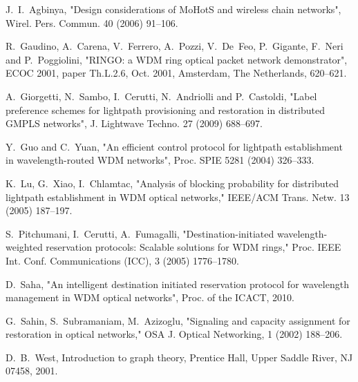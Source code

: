 \documentclass[journal,draftcls,onecolumn,12pt,twoside]{IEEEtran}
\begin{document}
\begin{thebibliography}{1}

J.~I.~Agbinya, "Design considerations of MoHotS and wireless chain networks", Wirel. Pers. Commun. 40 (2006) 91--106.

R.~Gaudino, A.~Carena, V.~Ferrero, A.~Pozzi, V.~De~Feo, P.~Gigante, F.~Neri and P.~Poggiolini, "RINGO: a WDM ring optical packet network demonstrator", ECOC 2001, paper Th.L.2.6, Oct. 2001, Amsterdam, The Netherlands, 620--621.

A.~Giorgetti, N.~Sambo, I.~Cerutti, N.~Andriolli and P.~Castoldi, "Label preference schemes for lightpath provisioning and restoration in distributed GMPLS networks", J. Lightwave Techno. 27 (2009) 688--697.

Y.~Guo and C.~Yuan, "An efficient control protocol for lightpath establishment in wavelength-routed WDM networks", Proc. SPIE  5281 (2004) 326--333.

K.~Lu, G.~Xiao, I.~Chlamtac, "Analysis of blocking probability for distributed lightpath establishment in WDM optical networks," IEEE/ACM Trans. Netw. 13 (2005) 187--197.

S.~Pitchumani, I.~Cerutti, A.~Fumagalli, "Destination-initiated wavelength-weighted reservation protocols: Scalable solutions for WDM rings," Proc. IEEE Int. Conf. Communications (ICC), 3 (2005) 1776--1780.



D.~Saha, "An intelligent destination initiated reservation protocol for wavelength management in WDM optical networks", Proc. of the ICACT, 2010.

G.~Sahin, S.~Subramaniam, M.~Azizoglu, "Signaling and capacity assignment for restoration in optical networks," OSA J. Optical Networking, 1 (2002) 188--206.

D.~B.~West, Introduction to graph theory, Prentice Hall, Upper Saddle River, NJ 07458, 2001.

\end{thebibliography}
\end{document}

